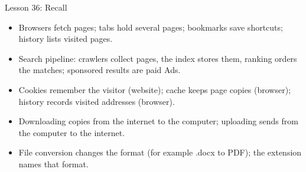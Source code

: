 \documentclass[aspectratio=169]{beamer}
\begin{document}
\begin{frame}{Lesson 36: Recall}
  \begin{itemize}
    \item Browsers fetch pages; tabs hold several pages; bookmarks save
      shortcuts; history lists visited pages.
    \item Search pipeline: crawlers collect pages, the index stores them,
      ranking orders the matches; sponsored results are paid Ads.
    \item Cookies remember the visitor (website); cache keeps page copies
      (browser); history records visited addresses (browser).
    \item Downloading copies from the internet to the computer; uploading
      sends from the computer to the internet.
    \item File conversion changes the format (for example .docx to PDF);
      the extension names that format.
  \end{itemize}
\end{frame}
\end{document}
